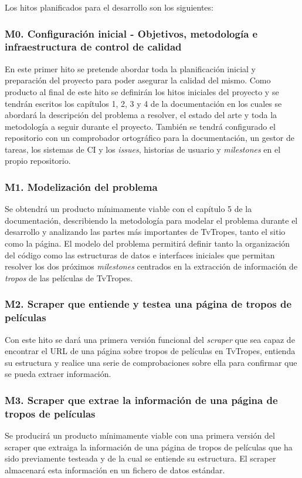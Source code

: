 Los hitos planificados para el desarrollo son los siguientes:

\subsubsection{M0. Configuración inicial - Objetivos, metodología e infraestructura de control de calidad}
En este primer hito se pretende abordar toda la planificación inicial y
preparación del proyecto para poder asegurar la calidad del mismo. Como producto
al final de este hito se definirán los hitos iniciales del proyecto y se tendrán
escritos los capítulos 1, 2, 3 y 4 de la documentación en los cuales se abordará
la descripción del problema a resolver, el estado del arte y toda la metodología
a seguir durante el proyecto. También se tendrá configurado el repositorio con
un comprobador ortográfico para la documentación, un gestor de tareas, los
sistemas de CI y los \textit{issues}, historias de usuario y \textit{milestones}
en el propio repositorio.

\subsubsection{M1. Modelización del problema}
Se obtendrá un producto mínimamente viable con el capítulo 5 de la
documentación, describiendo la metodología para modelar el problema durante el
desarrollo y analizando las partes más importantes de TvTropes, tanto el sitio
como la página. El modelo del problema permitirá definir tanto la organización
del código como las estructuras de datos e interfaces iniciales que permitan
resolver los dos próximos \textit{milestones} centrados en la extracción de
información de \textit{tropos} de las películas de TvTropes.

\subsubsection{M2. Scraper que entiende y testea una página de tropos de películas}
Con este hito se dará una primera versión funcional del \textit{scraper} que sea
capaz de encontrar el URL de una página sobre tropos de películas en TvTropes,
entienda su estructura y realice una serie de comprobaciones sobre ella para
confirmar que se pueda extraer información.

\subsubsection{M3. Scraper que extrae la información de una página de tropos de películas}
Se producirá un producto mínimamente viable con una primera versión del scraper
que extraiga la información de una página de tropos de películas que ha sido
previamente testeada y de la cual se entiende su estructura. El scraper
almacenará esta información en un fichero de datos estándar.

